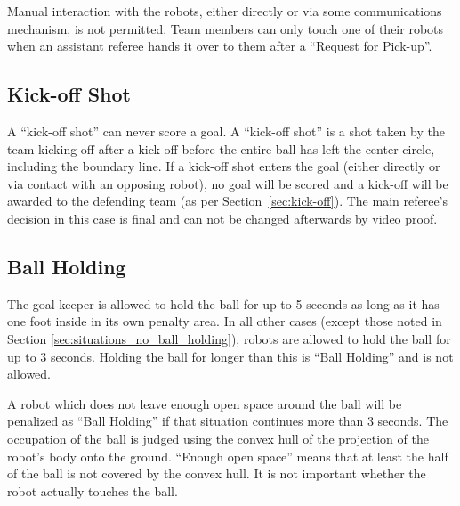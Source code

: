 \documentclass[12pt]{article}
\begin{document}
Manual interaction with the robots, either directly or via some communications mechanism, is not permitted. Team members can only touch one of their robots when an assistant referee hands it over to them after a ``Request for Pick-up''.

\subsection{Kick-off Shot}
\label{sec:kick-off_shot}

A ``kick-off shot'' can never score a goal. A ``kick-off shot'' is a shot taken by the team kicking off after a kick-off before the entire ball has left the center circle, including the boundary line. 
If a kick-off shot enters the goal (either directly or via contact with an opposing robot), no goal will be scored and a kick-off will be awarded to the defending team (as per Section~\ref{sec:kick-off}).
The main referee's decision in this case is final and can not be changed afterwards by video proof.

\subsection{Ball Holding}
\label{sec:ball_holding}

The goal keeper is allowed to hold the ball for up to 5 seconds as long as it has one foot inside in its own penalty area. In all other cases (except those noted in Section \ref{sec:situations_no_ball_holding}), robots are allowed to hold the ball for up to 3 seconds. Holding the ball for longer than this is ``Ball Holding'' and is not allowed.

A robot which does not leave enough open space around the ball will be penalized as ``Ball Holding'' if that situation continues more than 3 seconds. The occupation of the ball is judged using the convex hull of the projection of the robot's body onto the ground. ``Enough open space'' means that at least the half of the ball is not covered by the convex hull. It is not important whether the robot actually touches the ball.
\end{document}
